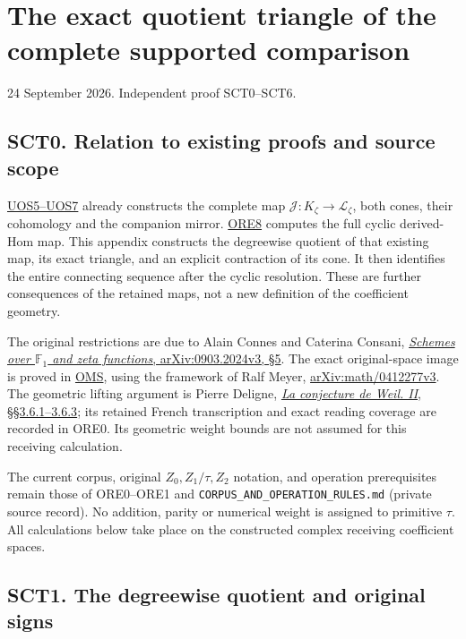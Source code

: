 \section{The exact quotient triangle of the complete supported
comparison}\label{the-exact-quotient-triangle-of-the-complete-supported-comparison}

24 September 2026. Independent proof SCT0--SCT6.

\subsection{SCT0. Relation to existing proofs and source
scope}\label{sct0.-relation-to-existing-proofs-and-source-scope}

\href{GLOBAL_UNIT_ORBIT_AND_SUPPORTED_COMPARISON.md}{UOS5--UOS7} already
constructs the complete map \(\mathcal J:K_\zeta\to\mathcal L_\zeta\),
both cones, their cohomology and the companion mirror.
\href{ORIGINAL_RESTRICTION_EXTENSION_AND_DELIGNE_CROSS.md}{ORE8}
computes the full cyclic derived-Hom map. This appendix constructs the
degreewise quotient of that existing map, its exact triangle, and an
explicit contraction of its cone. It then identifies the entire
connecting sequence after the cyclic resolution. These are further
consequences of the retained maps, not a new definition of the
coefficient geometry.

The original restrictions are due to Alain Connes and Caterina Consani,
\href{https://arxiv.org/abs/0903.2024v3}{\emph{Schemes over
\(\mathbb F_1\) and zeta functions}, arXiv:0903.2024v3, §5}. The exact
original-space image is proved in
\href{ORIGINAL_MELLIN_SPECTRAL_SYNTHESIS.md}{OMS}, using the framework
of Ralf Meyer,
\href{https://arxiv.org/abs/math/0412277v3}{arXiv:math/0412277v3}. The
geometric lifting argument is Pierre Deligne,
\href{https://www.numdam.org/item/PMIHES_1980__52__137_0/}{\emph{La
conjecture de Weil. II}, §§3.6.1--3.6.3}; its retained French
transcription and exact reading coverage are recorded in ORE0. Its
geometric weight bounds are not assumed for this receiving calculation.

The current corpus, original \(Z_0,Z_1/\tau,Z_2\) notation, and
operation prerequisites remain those of ORE0--ORE1 and
\nolinkurl{CORPUS_AND_OPERATION_RULES.md} (private source record). No addition, parity or numerical
weight is assigned to primitive \(\tau\). All calculations below take
place on the constructed complex receiving coefficient spaces.

\subsection{SCT1. The degreewise quotient and original
signs}\label{sct1.-the-degreewise-quotient-and-original-signs}

